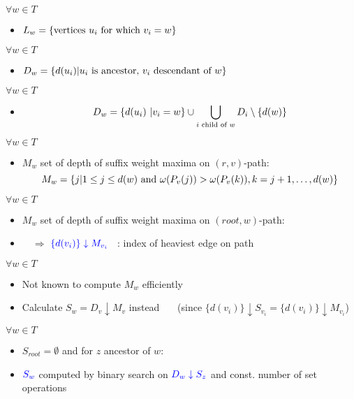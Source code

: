 \documentclass[18pt]{beamer}
\begin{document}
\begin{frame}
            \begin{overprint}
            	$\forall w \in T$
            	\begin{itemize}
            	\item $L_w = \{\textup{vertices }u_i \textup{ for which } v_i = w\}$
            	\end{itemize}
           		 $\forall w \in T$
           		 \begin{itemize}
            		\item $D_w = \{d(u_i) | u_i \textup{ is ancestor, } v_i \textup{ descendant of } w\}$
            	\end{itemize}
                $\forall w \in T$
                \begin{itemize}
                	\item \[D_w = \{d(u_i) \ | v_i = w\} \cup \bigcup_{i \textup{ child of } w } D_i \setminus \{d(w)\}\]
                \end{itemize}
            	$\forall w \in T$
            	\begin{itemize}
           		\item $M_w$ set of depth of suffix weight maxima on $(r,v)$-path:
           		\[
           		M_w = \{j | 1 \le j \le d(w) \textup{ and } \omega(P_v(j)) > \omega(P_v(k)), k = j+1, \dots, d(w)\}
           		\]
           		\end{itemize}
           	    $\forall w \in T$
           	    \begin{itemize}
           	    	\item $M_w$ set of depth of suffix weight maxima on $(root,w)$-path:
           	    	\item [] \ \ $\Rightarrow$ $\color{blue}\{d(v_i)\} \downarrow M_{v_i}$ \ : index of heaviest edge on path
           	    \end{itemize}
                $\forall w \in T$
                \begin{itemize}
                	\item Not known to compute $M_w$ efficiently
                	\item Calculate $S_w = D_v \downarrow M_v$ instead \ \ \ ({\footnotesize since $\{d(v_i)\} \downarrow S_{v_i} = \{d(v{_i})\} \downarrow M_{v_i}$})
                \end{itemize}
            	$\forall w \in T$
            	\begin{itemize}
            		\item $S_{root} = \emptyset$ and for $z$ ancestor of $w$:
            		\item $\color{blue} S_w$ computed by binary search on $\color{blue} D_w \downarrow S_z$ and const. number of set operations
            	\end{itemize}
            \end{overprint}
		
\end{frame}
\end{document}
